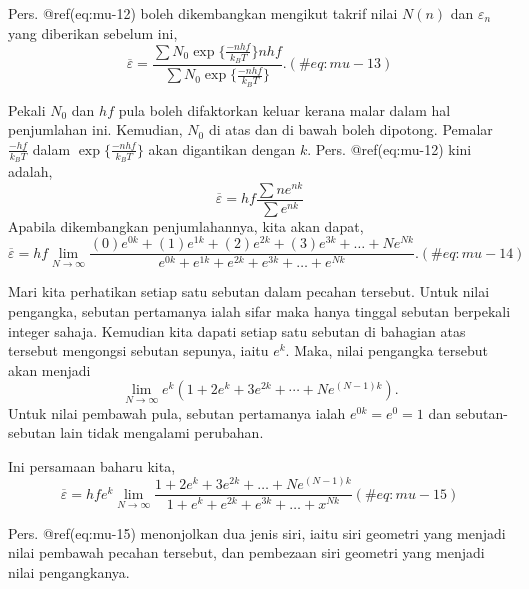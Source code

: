 \documentclass[
]{book}
\begin{document}
Pers. @ref(eq:mu-12) boleh dikembangkan mengikut takrif nilai \(N(n)\)
dan \(\varepsilon_n\) yang diberikan sebelum ini, \begin{equation}
\overline{\varepsilon} = \frac{\sum N_0\exp\Big\{\frac{-nhf}{k_BT}\Big\} nhf}{\sum N_0\exp\Big\{\frac{-nhf}{k_BT}\Big\}}.
(\#eq:mu-13)
\end{equation}

Pekali \(N_0\) dan \(hf\) pula boleh difaktorkan keluar kerana malar
dalam hal penjumlahan ini. Kemudian, \(N_0\) di atas dan di bawah boleh
dipotong. Pemalar \(\frac{-hf}{k_BT}\) dalam
\(\exp\Big\{\frac{-nhf}{k_BT}\Big\}\) akan digantikan dengan \(k\).
Pers. @ref(eq:mu-12) kini adalah,
\[\overline{\varepsilon} = hf\frac{\sum n e^{nk}}{\sum e^{nk}}\] Apabila
dikembangkan penjumlahannya, kita akan dapat, \begin{equation}
\overline{\varepsilon} = hf\lim_{N\to\infty}\frac{(0)e^{0k} + (1)e^{1k} + (2)e^{2k} + (3)e^{3k}+\dots+Ne^{Nk}}{e^{0k}+e^{1k}+e^{2k}+e^{3k}+\dots+e^{Nk}}.
(\#eq:mu-14)
\end{equation}

Mari kita perhatikan setiap satu sebutan dalam pecahan tersebut. Untuk
nilai pengangka, sebutan pertamanya ialah sifar maka hanya tinggal
sebutan berpekali integer sahaja. Kemudian kita dapati setiap satu
sebutan di bahagian atas tersebut mengongsi sebutan sepunya, iaitu
\(e^k\). Maka, nilai pengangka tersebut akan menjadi
\[\lim_{N\to\infty}e^k(1+2e^k+3e^{2k}+\cdots+Ne^{(N-1)k}).\] Untuk nilai
pembawah pula, sebutan pertamanya ialah \(e^{0k}=e^0=1\) dan
sebutan-sebutan lain tidak mengalami perubahan.

Ini persamaan baharu kita, \begin{equation}
\overline{\varepsilon} = hfe^k \lim_{N\to\infty} \frac{1+2e^k+3e^{2k}+\dots+Ne^{(N-1)k}}{1+e^k+e^{2k}+e^{3k}+\dots+x^{Nk}}
(\#eq:mu-15)
\end{equation}

Pers. @ref(eq:mu-15) menonjolkan dua jenis siri, iaitu siri geometri
yang menjadi nilai pembawah pecahan tersebut, dan pembezaan siri
geometri yang menjadi nilai pengangkanya.

\BeginKnitrBlock{theorem}{}
\end{document}
